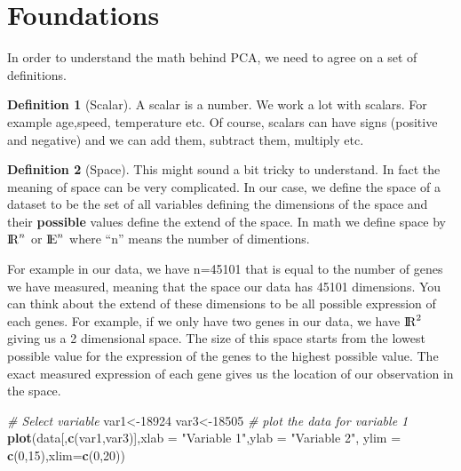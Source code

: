 \documentclass[
]{book}
\newenvironment{Shaded}{\begin{snugshade}}{\end{snugshade}}
\newcommand{\CommentTok}[1]{\textcolor[rgb]{0.56,0.35,0.01}{\textit{#1}}}
\newcommand{\DataTypeTok}[1]{\textcolor[rgb]{0.13,0.29,0.53}{#1}}
\newcommand{\DecValTok}[1]{\textcolor[rgb]{0.00,0.00,0.81}{#1}}
\newcommand{\KeywordTok}[1]{\textcolor[rgb]{0.13,0.29,0.53}{\textbf{#1}}}
\newcommand{\NormalTok}[1]{#1}
\newcommand{\StringTok}[1]{\textcolor[rgb]{0.31,0.60,0.02}{#1}}
\theoremstyle{definition}
\newtheorem{definition}{Definition}[chapter]
\theoremstyle{definition}
\theoremstyle{definition}
\theoremstyle{remark}
\begin{document}
\hypertarget{foundations}{%
\section{Foundations}\label{foundations}}

In order to understand the math behind PCA, we need to agree on a set of definitions.

\begin{definition}[Scalar]
\protect\hypertarget{def:scalar}{}{\label{def:scalar} \iffalse (Scalar) \fi{} }A scalar is a number. We work a lot with scalars. For example age,speed, temperature etc. Of course, scalars can have signs (positive and negative) and we can add them, subtract them, multiply etc.
\end{definition}

\begin{definition}[Space]
\protect\hypertarget{def:space}{}{\label{def:space} \iffalse (Space) \fi{} }This might sound a bit tricky to understand. In fact the meaning of space can be very complicated.
In our case, we define the space of a dataset to be the set of all variables defining the dimensions
of the space and their \textbf{possible} values define the extend of the space. In math we define space
by \({\rm I\!R}^n\) or \({\rm I\!E}^n\) where ``n'' means the number of dimentions.
\end{definition}

For example in our data, we have n=45101 that is equal to the number of genes we have measured, meaning that the space our data has 45101 dimensions. You can think about the extend of these dimensions to be all possible expression of each genes. For example, if we only have two genes in our data, we have \({\rm I\!R}^2\) giving us a 2 dimensional space. The size of this space starts from the lowest possible value for the expression of the genes to the highest possible value. The exact measured expression of each gene gives us the location of our observation in the space.

\begin{Shaded}
\begin{Highlighting}[]
\CommentTok{# Select variable}
\NormalTok{var1<-}\DecValTok{18924}
\NormalTok{var3<-}\DecValTok{18505}
\CommentTok{# plot the data for variable 1}
\KeywordTok{plot}\NormalTok{(data[,}\KeywordTok{c}\NormalTok{(var1,var3)],}\DataTypeTok{xlab =} \StringTok{"Variable 1"}\NormalTok{,}\DataTypeTok{ylab =} \StringTok{"Variable 2"}\NormalTok{,}
     \DataTypeTok{ylim =} \KeywordTok{c}\NormalTok{(}\DecValTok{0}\NormalTok{,}\DecValTok{15}\NormalTok{),}\DataTypeTok{xlim=}\KeywordTok{c}\NormalTok{(}\DecValTok{0}\NormalTok{,}\DecValTok{20}\NormalTok{))}
\end{Highlighting}
\end{Shaded}
\end{document}
